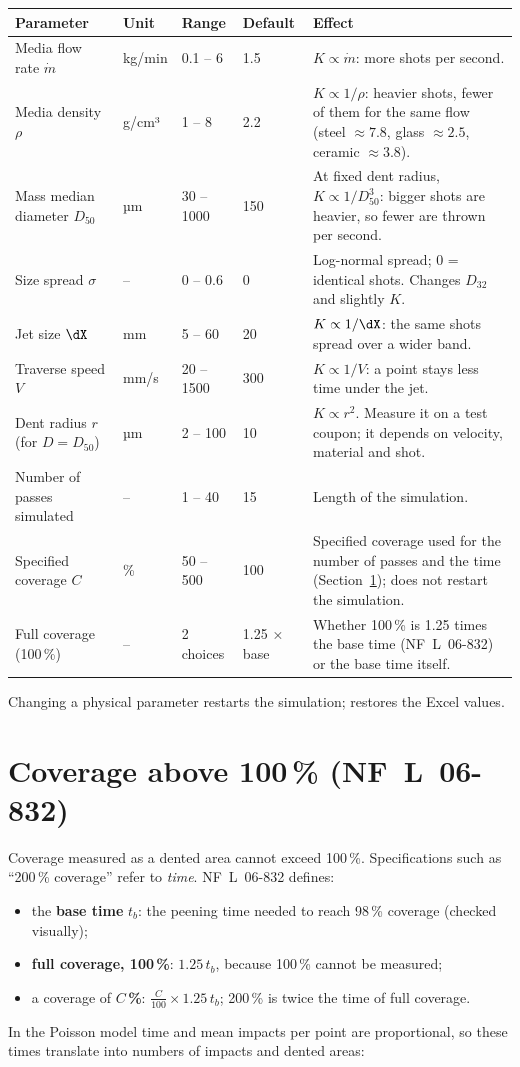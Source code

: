 \documentclass[11pt,a4paper]{article}
\begin{document}
\begin{longtable}{@{}p{3.4cm}p{1.55cm}p{2.0cm}p{1.5cm}p{4.9cm}@{}}
\toprule
\textbf{Parameter} & \textbf{Unit} & \textbf{Range} & \textbf{Default} & \textbf{Effect}\\ \midrule\endhead
Media flow rate $\dot m$ & kg/min & 0.1 -- 6 & 1.5 & $K\propto\dot m$: more shots per second.\\
Media density $\rho$ & g/cm³ & 1 -- 8 & 2.2 & $K\propto1/\rho$: heavier shots, fewer of them for the same flow (steel $\approx7.8$, glass $\approx2.5$, ceramic $\approx3.8$).\\
Mass median diameter $D_{50}$ & µm & 30 -- 1000 & 150 & At fixed dent radius, $K\propto1/D_{50}^3$: bigger shots are heavier, so fewer are thrown per second.\\
Size spread $\sigma$ & -- & 0 -- 0.6 & 0 & Log-normal spread; 0 = identical shots. Changes $D_{32}$ and slightly $K$.\\
Jet size $\dX$ & mm & 5 -- 60 & 20 & $K\propto1/\dX$: the same shots spread over a wider band.\\
Traverse speed $V$ & mm/s & 20 -- 1500 & 300 & $K\propto1/V$: a point stays less time under the jet.\\
Dent radius $r$ (for $D=D_{50}$) & µm & 2 -- 100 & 10 & $K\propto r^2$. Measure it on a test coupon; it depends on velocity, material and shot.\\
Number of passes simulated & -- & 1 -- 40 & 15 & Length of the simulation.\\
Specified coverage $C$ & \% & 50 -- 500 & 100 & Specified coverage used for the number of passes and the time (Section~\ref{sec:above}); does not restart the simulation.\\
Full coverage (100\,\%) & -- & 2 choices & 1.25 × base & Whether 100\,\% is 1.25 times the base time (NF~L~06-832) or the base time itself.\\
\bottomrule
\end{longtable}
\noindent Changing a physical parameter restarts the simulation;  restores the Excel values.

\section{Coverage above 100\,\% (NF~L~06-832)}\label{sec:above}

Coverage measured as a dented area cannot exceed 100\,\%. Specifications such as ``200\,\% coverage'' refer to \emph{time}. NF~L~06-832 defines:
\begin{itemize}[nosep]
\item the \textbf{base time} $t_b$: the peening time needed to reach 98\,\% coverage (checked visually);
\item \textbf{full coverage, 100\,\%}: $1.25\,t_b$, because 100\,\% cannot be measured;
\item a coverage of \textbf{$C$\,\%}: $\frac{C}{100}\times1.25\,t_b$; 200\,\% is twice the time of full coverage.
\end{itemize}
In the Poisson model time and mean impacts per point are proportional, so these times translate into numbers of impacts and dented areas:
\end{document}
